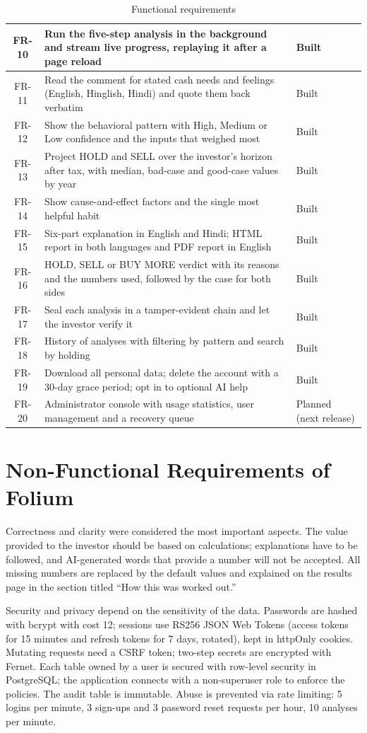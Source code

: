 \begin{table}[H]
\begin{tabularx}{\textwidth}{|c|L|P{2.2cm}|}
\hline
FR-10 & Run the five-step analysis in the background and stream live progress, replaying it after a page reload & Built \\
\hline
FR-11 & Read the comment for stated cash needs and feelings (English, Hinglish, Hindi) and quote them back verbatim & Built \\
\hline
FR-12 & Show the behavioral pattern with High, Medium or Low confidence and the inputs that weighed most & Built \\
\hline
FR-13 & Project HOLD and SELL over the investor's horizon after tax, with median, bad-case and good-case values by year & Built \\
\hline
FR-14 & Show cause-and-effect factors and the single most helpful habit & Built \\
\hline
FR-15 & Six-part explanation in English and Hindi; HTML report in both languages and PDF report in English & Built \\
\hline
FR-16 & HOLD, SELL or BUY MORE verdict with its reasons and the numbers used, followed by the case for both sides & Built \\
\hline
FR-17 & Seal each analysis in a tamper-evident chain and let the investor verify it & Built \\
\hline
FR-18 & History of analyses with filtering by pattern and search by holding & Built \\
\hline
FR-19 & Download all personal data; delete the account with a 30-day grace period; opt in to optional AI help & Built \\
\hline
FR-20 & Administrator console with usage statistics, user management and a recovery queue & Planned (next release) \\
\hline
\end{tabularx}
\caption{Functional requirements}
\label{tab:fr}
\end{table}

\section{Non-Functional Requirements of Folium}
Correctness and clarity were considered the most important aspects. The value provided to the investor should be based on calculations; explanations have to be followed, and AI-generated words that provide a number will not be accepted. All missing numbers are replaced by the default values and explained on the results page in the section titled “How this was worked out.”

Security and privacy depend on the sensitivity of the data. Passwords are hashed with bcrypt with cost 12; sessions use RS256 JSON Web Tokens (access tokens for 15 minutes and refresh tokens for 7 days, rotated), kept in httpOnly cookies. Mutating requests need a CSRF token; two-step secrets are encrypted with Fernet. Each table owned by a user is secured with row-level security in PostgreSQL; the application connects with a non-superuser role to enforce the policies. The audit table is immutable. Abuse is prevented via rate limiting: 5 logins per minute, 3 sign-ups and 3 password reset requests per hour, 10 analyses per minute.


